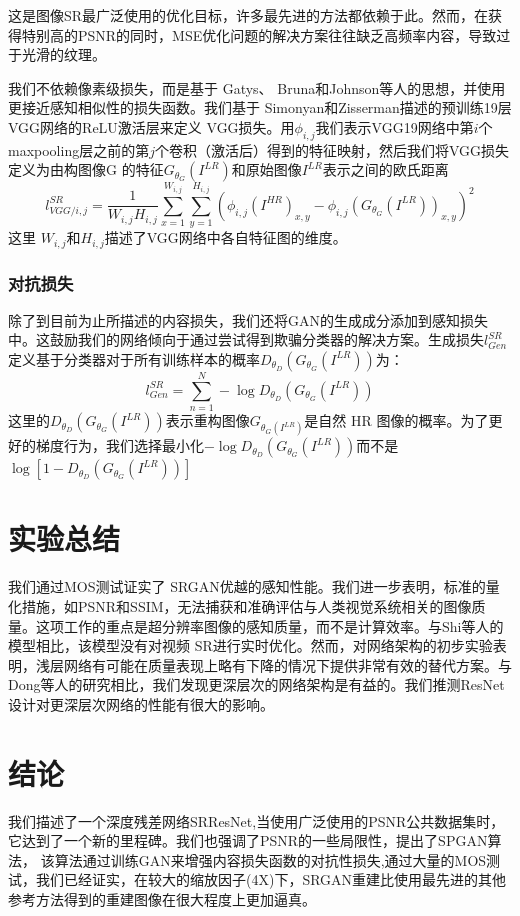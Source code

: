 \documentclass[UTF8,a4paper,10pt]{ctexrep}
\begin{document}
这是图像SR最广泛使用的优化目标，许多最先进的方法都依赖于此。然而，在获得特别高的PSNR的同时，MSE优化问题的解决方案往往缺乏高频率内容，导致过于光滑的纹理。

我们不依赖像素级损失，而是基于 Gatys、 Bruna和Johnson等人的思想，并使用更接近感知相似性的损失函数。我们基于 Simonyan和Zisserman描述的预训练19层VGG网络的ReLU激活层来定义 VGG损失。用$\phi_{i, j}$我们表示VGG19网络中第$i$个 maxpooling层之前的第$j$个卷积（激活后）得到的特征映射，然后我们将VGG损失定义为由构图像G 的特征$G_{\theta_G}(I^{LR})$和原始图像$I^{LR}$表示之间的欧氏距离
\begin{equation}
  l_{VGG / i, j}^{SR} = \frac{1}{W_{i, j}H_{i, j}}\sum_{x = 1}^{W_{i, j}}\sum_{y = 1}^{H_{i, j}}(\phi_{i, j}(I^{HR})_{x, y} - \phi_{i, j}(G_{\theta_G}(I^{LR}))_{x, y})^2\label{eq:5}
\end{equation}
这里 $W_{i, j}$和$H_{i, j}$描述了VGG网络中各自特征图的维度。

\subsubsection{对抗损失}
除了到目前为止所描述的内容损失，我们还将GAN的生成成分添加到感知损失中。这鼓励我们的网络倾向于通过尝试得到欺骗分类器的解决方案。生成损失$l_{Gen}^{SR}$定义基于分类器对于所有训练样本的概率$D_{\theta_D}(G_{\theta_G}(I^{LR}))$为：
\begin{equation}
  l_{Gen}^{SR} = \sum_{n = 1}^{N} -\log{D_{\theta_D}(G_{\theta_G}(I^{LR}))}\label{eq:6}
\end{equation}
这里的$D_{\theta_D}(G_{\theta_G}(I^{LR}))$表示重构图像$G_{\theta_G(I^{LR})}$是自然 HR 图像的概率。为了更好的梯度行为，我们选择最小化$-\log{D_{\theta_D}(G_{\theta_G}(I^{LR}))}$而不是$\log{[1 - D_{\theta_D}(G_{\theta_G}(I^{LR}))]}$

\section{实验总结}
我们通过MOS测试证实了 SRGAN优越的感知性能。我们进一步表明，标准的量化措施，如PSNR和SSIM，无法捕获和准确评估与人类视觉系统相关的图像质量。这项工作的重点是超分辨率图像的感知质量，而不是计算效率。与Shi等人的模型相比，该模型没有对视频 SR进行实时优化。然而，对网络架构的初步实验表明，浅层网络有可能在质量表现上略有下降的情况下提供非常有效的替代方案。与Dong等人的研究相比，我们发现更深层次的网络架构是有益的。我们推测ResNet 设计对更深层次网络的性能有很大的影响。

\section{结论}
我们描述了一个深度残差网络SRResNet,当使用广泛使用的PSNR公共数据集时，它达到了一个新的里程碑。我们也强调了PSNR的一些局限性，提出了SPGAN算法，
该算法通过训练GAN来增强内容损失函数的对抗性损失,通过大量的MOS测试，我们已经证实，在较大的缩放因子(4X)下，SRGAN重建比使用最先进的其他参考方法得到的重建图像在很大程度上更加逼真。

% 
% 
\end{document}
